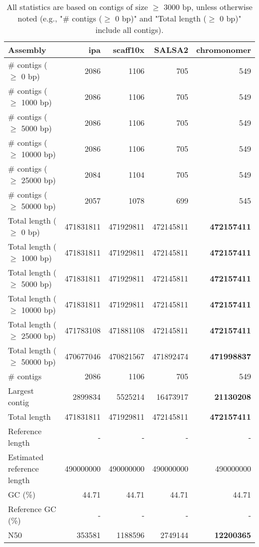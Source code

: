 \documentclass[12pt,a4paper]{article}
\begin{document}
\begin{table}[ht]
\begin{center}
\caption{All statistics are based on contigs of size $\geq$ 3000 bp, unless otherwise noted (e.g., "\# contigs ($\geq$ 0 bp)" and "Total length ($\geq$ 0 bp)" include all contigs).}
\begin{tabular}{|l*{4}{|r}|}
\hline
Assembly & ipa & scaff10x & SALSA2 & chromonomer \\ \hline
\# contigs ($\geq$ 0 bp) & 2086 & 1106 & 705 & 549 \\ \hline
\# contigs ($\geq$ 1000 bp) & 2086 & 1106 & 705 & 549 \\ \hline
\# contigs ($\geq$ 5000 bp) & 2086 & 1106 & 705 & 549 \\ \hline
\# contigs ($\geq$ 10000 bp) & 2086 & 1106 & 705 & 549 \\ \hline
\# contigs ($\geq$ 25000 bp) & 2084 & 1104 & 705 & 549 \\ \hline
\# contigs ($\geq$ 50000 bp) & 2057 & 1078 & 699 & 545 \\ \hline
Total length ($\geq$ 0 bp) & 471831811 & 471929811 & 472145811 & {\bf 472157411} \\ \hline
Total length ($\geq$ 1000 bp) & 471831811 & 471929811 & 472145811 & {\bf 472157411} \\ \hline
Total length ($\geq$ 5000 bp) & 471831811 & 471929811 & 472145811 & {\bf 472157411} \\ \hline
Total length ($\geq$ 10000 bp) & 471831811 & 471929811 & 472145811 & {\bf 472157411} \\ \hline
Total length ($\geq$ 25000 bp) & 471783108 & 471881108 & 472145811 & {\bf 472157411} \\ \hline
Total length ($\geq$ 50000 bp) & 470677046 & 470821567 & 471892474 & {\bf 471998837} \\ \hline
\# contigs & 2086 & 1106 & 705 & 549 \\ \hline
Largest contig & 2899834 & 5525214 & 16473917 & {\bf 21130208} \\ \hline
Total length & 471831811 & 471929811 & 472145811 & {\bf 472157411} \\ \hline
Reference length & - & - & - & - \\ \hline
Estimated reference length & 490000000 & 490000000 & 490000000 & 490000000 \\ \hline
GC (\%) & 44.71 & 44.71 & 44.71 & 44.71 \\ \hline
Reference GC (\%) & - & - & - & - \\ \hline
N50 & 353581 & 1188596 & 2749144 & {\bf 12200365} \\ \hline

\end{tabular}
\end{center}
\end{table}
\end{document}
